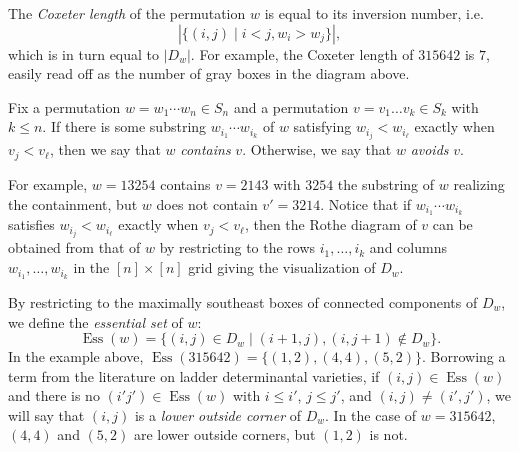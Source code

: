 \documentclass[ALCO,Unicode,published]{cedram}
\DeclareMathOperator{\Ess}{Ess}
\begin{document}
The \emph{Coxeter length} of the permutation $w$ is equal to its inversion number, i.e. 
\[| \{ (i, j) \mid i < j, w_i > w_j \}|,
\] which is in turn equal to $|D_w|$.  For example, the Coxeter length of $315642$ is $7$, easily read off as the number of gray boxes in the diagram above.

\begin{definition}
Fix a permutation $w = w_1 \cdots w_n \in S_n$ and a permutation $v  = v_1\ldots v_k \in S_k$ with $k \leq n$.  If there is some substring $w_{i_1} \cdots w_{i_k}$ of $w$ satisfying $w_{i_j} < w_{i_\ell}$ exactly when $v_j < v_\ell$, then we say that $w$ \emph{contains} $v$.  Otherwise, we say that $w$ \emph{avoids} $v$.
\end{definition}

For example, $w = 13254$ contains $v = 2143$ with $3254$ the substring of $w$ realizing the containment, but $w$ does not contain $v' = 3214$.  Notice that if $w_{i_1} \cdots w_{i_k}$ satisfies $w_{i_j} < w_{i_\ell}$ exactly when $v_j < v_\ell$, then the Rothe diagram of $v$ can be obtained from that of $w$ by restricting to the rows $i_1, \ldots, i_k$ and columns $w_{i_1}, \ldots, w_{i_k}$ in the $[n] \times [n]$ grid giving the visualization of $D_w$.  

By restricting to the maximally southeast boxes of connected components of $D_w$, we define the \emph{essential set} of $w$: 
\[
\Ess(w) = \{(i,j) \in D_w \mid (i+1,j), (i,j+1) \notin D_w\}.
\]
In the example above, $\Ess(315642)=\{(1,2),(4,4), (5,2)\}$.  Borrowing a term from the literature on ladder determinantal varieties, if $(i,j) \in \Ess(w)$ and there is no $(i'j') \in \Ess(w)$ with $i \leq i'$, $j \leq j'$, and $(i,j) \neq (i',j')$, we will say that $(i,j)$ is a \emph{lower outside corner} of $D_w$.  In the case of $w = 315642$, $(4,4)$ and $(5,2)$ are lower outside corners, but $(1,2)$ is not.  
\end{document}

